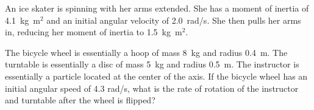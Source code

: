 \documentclass[10pt]{exam}
\begin{document}
\begin{questions}

\question
  An ice skater is spinning with her arms extended. She has a moment of inertia of 4.1~kg~m$^2$ and an initial angular velocity of 2.0~rad/s. She then pulls her arms in, reducing her moment of inertia to 1.5~kg~m$^2$.

  \vs

\question
  The bicycle wheel is essentially a hoop of mass 8~kg and radius 0.4~m.  The turntable is essentially a disc of mass 5~kg and radius 0.5~m.  The instructor is essentially a particle located at the center of the axis.  If the bicycle wheel has an initial angular speed of 4.3 rad/s, what is the rate of rotation of the instructor and turntable after the wheel is flipped?
  \vs



  
\end{questions}
\end{document}
